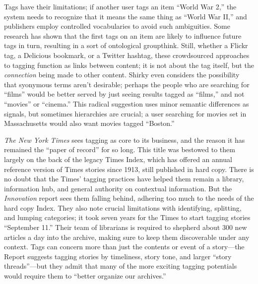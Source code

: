 Tags have their limitations; if another user tags an item ``World War 2,'' the system needs to recognize that it means the same thing as ``World War II,'' and publishers employ controlled vocabularies to avoid such ambiguities. Some research has shown that the first tags on an item are likely to influence future tags in turn, resulting in a sort of ontological groupthink.\autocite{cattuto_semiotic_2007} Still, whether a Flickr tag, a Delicious bookmark, or a Twitter hashtag, these crowdsourced approaches to tagging function as links between content; it is not about the tag itself, but the \emph{connection} being made to other content. Shirky even considers the possibility that syonymous terms aren't desirable; perhaps the people who are searching for ``films'' would be better served by just seeing results tagged as ``films,'' and not ``movies'' or ``cinema.''\autocite{shirky_ontology_2005} This radical suggestion uses minor semantic differences as signals, but sometimes hierarchies are crucial; a user searching for movies set in Massachusetts would also want movies tagged ``Boston.''

\emph{The New York Times} sees tagging as core to its business, and the reason it has remained the ``paper of record'' for so long.\autocite[41]{_innovation_2014} This title was bestowed to them largely on the back of the legacy Times Index, which has offered an annual reference version of Times stories since 1913, still published in hard copy. There is no doubt that the Times' tagging practices have helped them remain a library, information hub, and general authority on contextual information. But the \emph{Innovation} report sees them falling behind, adhering too much to the needs of the hard copy Index. They also note crucial limitations with identifying, splitting, and lumping categories; it took seven years for the Times to start tagging stories ``September 11.'' Their team of librarians is required to shepherd about 300 new articles a day into the archive, making sure to keep them discoverable under any context. Tags can concern more than just the contents or event of a story---the Report suggests tagging stories by timeliness, story tone, and larger ``story threads''---but they admit that many of the more exciting tagging potentials would require them to ``better organize our archives.''\autocite[41-42]{_innovation_2014}


